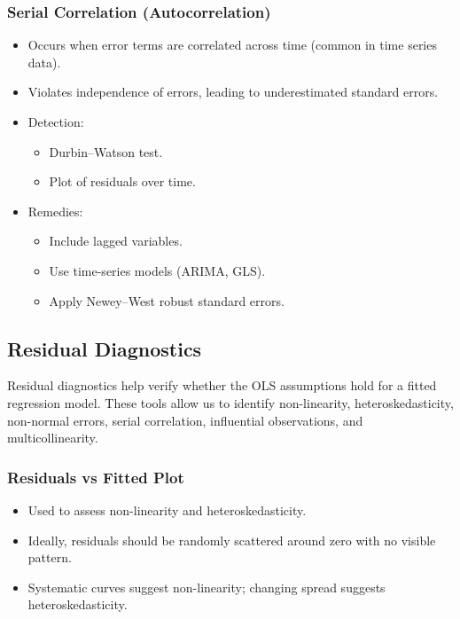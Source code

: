 \documentclass[11pt,a4paper]{article}
\begin{document}
\subsubsection{Serial Correlation (Autocorrelation)}

\begin{itemize}
    \item Occurs when error terms are correlated across time (common in time series data).
    \item Violates independence of errors, leading to underestimated standard errors.
    \item Detection:
    \begin{itemize}
        \item Durbin–Watson test.
        \item Plot of residuals over time.
    \end{itemize}
    \item Remedies:
    \begin{itemize}
        \item Include lagged variables.
        \item Use time-series models (ARIMA, GLS).
        \item Apply Newey–West robust standard errors.
    \end{itemize}
\end{itemize}

\subsection{Residual Diagnostics}

Residual diagnostics help verify whether the OLS assumptions hold for a fitted regression model.  
These tools allow us to identify non-linearity, heteroskedasticity, non-normal errors, serial correlation,  
influential observations, and multicollinearity.

\subsubsection{Residuals vs Fitted Plot}

\begin{itemize}
    \item Used to assess non-linearity and heteroskedasticity.
    \item Ideally, residuals should be randomly scattered around zero with no visible pattern.
    \item Systematic curves suggest non-linearity; changing spread suggests heteroskedasticity.
\end{itemize}
\end{document}
